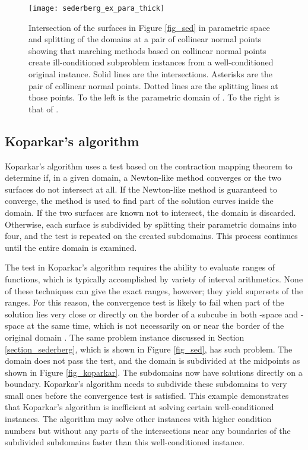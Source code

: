 \documentclass{article}
\begin{document}
\begin{figure}
\centering
\texttt{[image: sederberg\_ex\_para\_thick]}
\caption{Intersection of the surfaces in Figure \ref{fig_sed} in parametric space and splitting of the domains at a pair of collinear normal points showing that marching methods based on collinear normal points create ill-conditioned subproblem instances from a well-conditioned original instance.  Solid lines are the intersections. Asterisks are the pair of collinear normal points.  Dotted lines are the splitting lines at those points. To the left is the parametric domain of .  To the right is that of .}
\label{fig_sed_para}
\end{figure}

\subsection{Koparkar's algorithm}
\label{section_koparkar_cond}

Koparkar's algorithm uses a test based on the contraction mapping theorem
to determine if, in a given domain, a Newton-like method converges or
the two surfaces do not intersect at all.  If the Newton-like method
is guaranteed to converge, the method is used to find part of the
solution curves inside the domain.  If the two surfaces are known 
not to intersect, the domain is discarded.  Otherwise, each surface is
subdivided by splitting their parametric domains into four, 
and the test is repeated on the created subdomains.
This process continues until the entire domain is examined.

The test in Koparkar's algorithm requires the ability to evaluate
ranges of functions, which is typically accomplished by variety of
interval arithmetics.  None of these techniques can give the exact
ranges, however; they yield supersets of the ranges.  For this reason,
the convergence test is likely to fail when part of the
solution lies very close or directly on the border of a subcube in
both -space and -space at the same time, which is
not necessarily on or near the border of the original domain
.  The same problem instance discussed in Section
\ref{section_sederberg}, which is shown in Figure \ref{fig_sed}, has
such problem.  The domain  does not pass the test, and the
domain is subdivided at the midpoints as shown in Figure
\ref{fig_koparkar}.  The subdomains now have solutions directly on a
boundary.  Koparkar's algorithm needs to subdivide these subdomains to
very small ones before the convergence test is satisfied.  This
example demonstrates that Koparkar's algorithm is inefficient at
solving certain well-conditioned instances.  The algorithm may solve
other instances with higher condition numbers but without any parts of
the intersections near any boundaries of the subdivided subdomains
faster than this well-conditioned instance.
\end{document}
